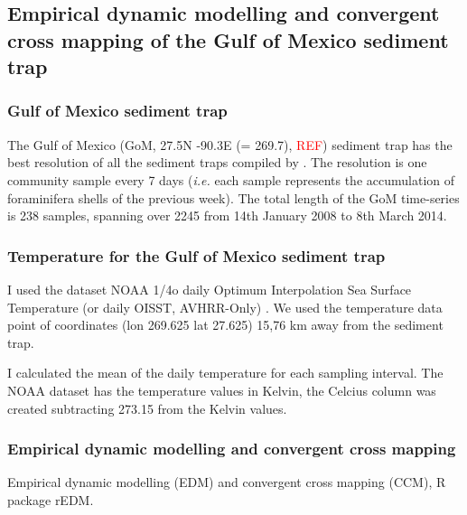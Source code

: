 \subsection{Empirical dynamic modelling and convergent cross mapping of the Gulf of Mexico sediment trap}

\subsubsection{Gulf of Mexico sediment trap}
The Gulf of Mexico (GoM, 27.5N -90.3E (= 269.7), \textcolor{red}{REF}) sediment trap has the best resolution of all the sediment traps compiled by \cite{jonkers2015global}. The resolution is one community sample every 7 days (\textit{i.e.} each sample represents the accumulation of foraminifera shells of the previous week). The total length of the GoM time-series is 238 samples, spanning over 2245 from 14th January 2008 to 8th March 2014.

\subsubsection{Temperature for the Gulf of Mexico sediment trap}
I used the dataset NOAA 1/4o daily Optimum Interpolation Sea Surface Temperature (or daily OISST, AVHRR-Only) \citep{smith2016oisst}.  %
We used the temperature data point of coordinates (lon 269.625  lat 27.625) 15,76 km away from the sediment trap. 

I calculated the mean of the daily temperature for each sampling interval. The NOAA dataset has the temperature values in Kelvin, the Celcius column was created subtracting 273.15 from the Kelvin values. 


\subsubsection{Empirical dynamic modelling and convergent cross mapping}
Empirical dynamic modelling (EDM) and convergent cross mapping (CCM), R package rEDM.




